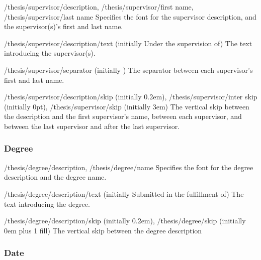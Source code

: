 \begin{fontkeylist}{
    /thesis/supervisor/description,
    /thesis/supervisor/first name,
    /thesis/supervisor/last name}
  Specifies the font for the supervisor description, and the supervisor(s)'s
  first and last name.
\end{fontkeylist}

\begin{key}{/thesis/supervisor/description/text (initially Under the supervision of)}
  The text introducing the supervisor(s).
\end{key}

\begin{key}{/thesis/supervisor/separator (initially \string\space)}
  The separator between each supervisor's first and last name.
\end{key}

\begin{keylist}{
    /thesis/supervisor/description/skip (initially 0.2em),
    /thesis/supervisor/inter skip (initially 0pt),
    /thesis/supervisor/skip (initially 3em)}
  The vertical skip between the description and the first supervisor's name,
  between each supervisor, and between the last supervisor and after the last supervisor.
\end{keylist}

\subsubsection{Degree}
\label{subsubsec:degree}

\begin{fontkeylist}{
    /thesis/degree/description,
    /thesis/degree/name}
  Specifies the font for the degree description and the degree name.
\end{fontkeylist}

\begin{key}{/thesis/degree/description/text (initially Submitted in the fulfillment of)}
  The text introducing the degree.
\end{key}

\begin{keylist}{
    /thesis/degree/description/skip (initially 0.2em),
    /thesis/degree/skip (initially 0em plus 1 fill)}
  The vertical skip between the degree description
\end{keylist}

\subsubsection{Date}
\label{subsubsec:date}

